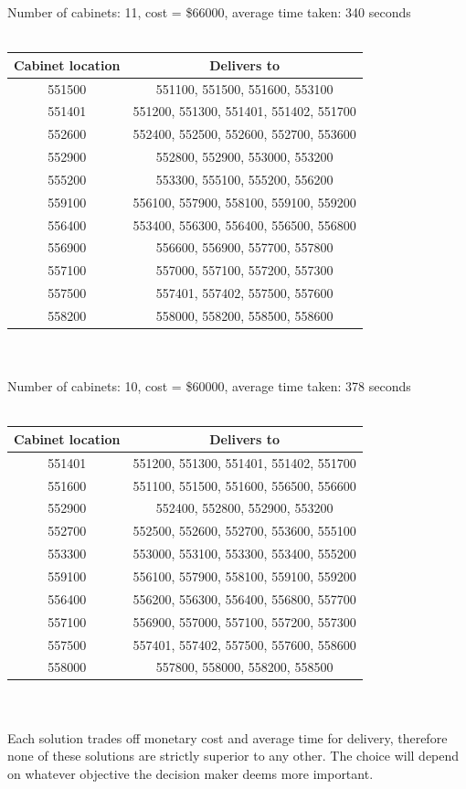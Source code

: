 \documentclass[10pt,a4paper]{article}
\begin{document}
\begin{enumerate}
Number of cabinets: 11, cost = \$66000, average time taken: 340 seconds\\ \\
\begin{tabular}{|c|c|}
	\hline 
	Cabinet location & Delivers to \\ 
	\hline 
	551500 & 551100, 551500, 551600, 553100 \\ 
	\hline 
	551401 & 551200, 551300, 551401, 551402, 551700 \\ 
	\hline 
	552600 & 552400, 552500, 552600, 552700, 553600 \\ 
	\hline 
	552900 & 552800, 552900, 553000, 553200 \\ 
	\hline 
	555200 & 553300, 555100, 555200, 556200 \\ 
	\hline 
	559100 & 556100, 557900, 558100, 559100, 559200 \\ 
	\hline 
	556400 & 553400, 556300, 556400, 556500, 556800 \\ 
	\hline 
	556900 & 556600, 556900, 557700, 557800 \\ 
	\hline 
	557100 & 557000, 557100, 557200, 557300 \\ 
	\hline 
	557500 & 557401, 557402, 557500, 557600 \\ 
	\hline 
	558200 & 558000, 558200, 558500, 558600 \\ 
	\hline 
\end{tabular} \\ \\

Number of cabinets: 10, cost = \$60000, average time taken: 378 seconds\\ \\
\begin{tabular}{|c|c|}
	\hline 
	Cabinet location & Delivers to \\ 
	\hline 
	551401 & 551200, 551300, 551401, 551402, 551700 \\ 
	\hline 
	551600 & 551100, 551500, 551600, 556500, 556600 \\ 
	\hline 
	552900 & 552400, 552800, 552900, 553200 \\ 
	\hline 
	552700 & 552500, 552600, 552700, 553600, 555100 \\ 
	\hline 
	553300 & 553000, 553100, 553300, 553400, 555200 \\ 
	\hline 
	559100 & 556100, 557900, 558100, 559100, 559200 \\ 
	\hline 
	556400 & 556200, 556300, 556400, 556800, 557700 \\ 
	\hline 
	557100 & 556900, 557000, 557100, 557200, 557300 \\ 
	\hline 
	557500 & 557401, 557402, 557500, 557600, 558600 \\ 
	\hline 
	558000 & 557800, 558000, 558200, 558500 \\ 
	\hline 
\end{tabular} \\ \\

Each solution trades off monetary cost and average time for delivery, therefore none of these solutions are strictly superior to any other. The choice will depend on whatever objective the decision maker deems more important.
\end{enumerate}
\end{document}
